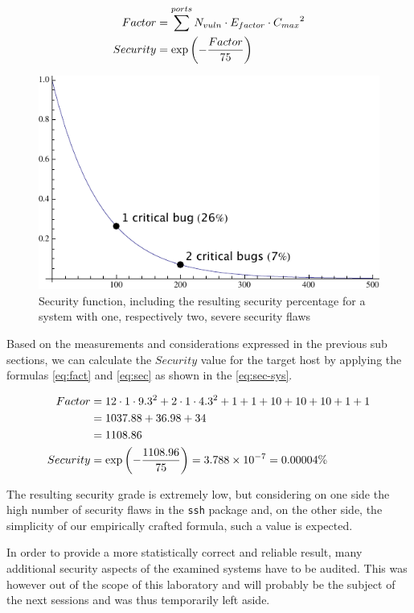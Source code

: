 \documentclass[10pt,a4paper,twoside,onecolumn]{article}
\begin{document}
\vspace{-.5cm}
\begin{align}
	\label{eq:fact}
Factor &= \sum\limits^{ports}{N_{vuln} \cdot E_{factor} \cdot {C_{max}}^2}\\
	\label{eq:sec}
   Security &= \exp\left(-{Factor \over 75}\right)
\end{align}

\begin{figure}[ht]
	\centering
	\includegraphics[width=.6\textwidth]{images/sec-plot}
	\caption{Security function, including the resulting security percentage for a system with one, respectively two, severe security flaws}
	\label{fig:sec-plot}
\end{figure}

Based on the measurements and considerations expressed in the previous sub sections, we can calculate the $Security$ value for the target host by applying the formulas \ref{eq:fact} and \ref{eq:sec} as shown in the \autoref{eq:sec-sys}.

\vspace{-.5cm}
\begin{align}
	Factor &= 12 \cdot 1 \cdot 9.3^2 + 2 \cdot 1 \cdot 4.3^2 + 1 + 1 + 10 + 10 + 10 + 1 + 1 \nonumber\\
			 &= 1037.88 + 36.98 + 34 \nonumber\\
			 &= 1108.86\nonumber\\
	\label{eq:sec-sys}
	Security &= \exp\left(-{1108.96\over75}\right) = 3.788 \times 10^{-7} = 0.00004\%
\end{align}

The resulting security grade is extremely low, but considering on one side the high number of security flaws in the \texttt{ssh} package and, on the other side, the simplicity of our empirically crafted formula, such a value is expected.

In order to provide a more statistically correct and reliable result, many additional security aspects of the examined systems have to be audited. This was however out of the scope of this laboratory and will probably be the subject of the next sessions and was thus temporarily left aside.
\end{document}
